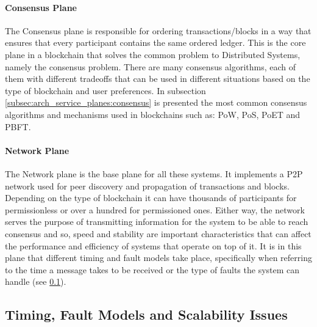 \paragraph{Consensus Plane}

The Consensus plane is responsible for ordering transactions/blocks in a way that ensures that every participant contains the same ordered ledger. This is the core plane in a blockchain that solves the common problem to Distributed Systems, namely the consensus problem. There are many consensus algorithms, each of them with different tradeoffs that can be used in different situations based on the type of blockchain and user preferences. In subsection \ref{subsec:arch_service_planes:consensus} is presented the most common consensus algorithms and mechanisms used in blockchains such as: \gls{PoW}, \gls{PoS}, \gls{PoET} and \gls{PBFT}.

\paragraph{Network Plane}

The Network plane is the base plane for all these systems. It implements a \gls{P2P} network used for peer discovery and propagation of transactions and blocks. Depending on the type of blockchain it can have thousands of participants for permissionless or over a hundred for permissioned ones. Either way, the network serves the purpose of transmitting information for the system to be able to reach consensus and so, speed and stability are important characteristics that can affect the performance and efficiency of systems that operate on top of it. It is in this plane that different timing and fault models take place, specifically when referring to the time a message takes to be received or the type of faults the system can handle (see \ref{subsec:arch_service_planes:timing_fault_models}).   %

\subsection{Timing, Fault Models and Scalability Issues}
\label{subsec:arch_service_planes:timing_fault_models}

